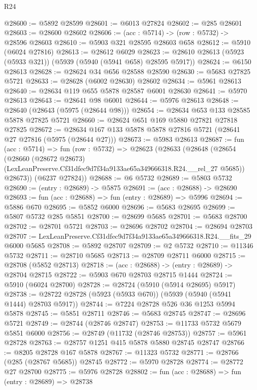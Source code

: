 \begin{lexlean}{R24}
\begin{coremodule}
@28600 := @5892 @28599
@28601 := @6013 @27824
@28602 := @285 @28601
@28603 := @28600 @28602
@28606 := (acc : @5714) -> (row : @5732) -> @28596 @28603
@28610 := @5903 @321 @28595 @28603 @658
@28612 := @5910 (@6024 @27816)
@28613 := @28612 @6029
@28623 := @28610 @28613 (@5923 (@5933 @321)) (@5939 (@5940 (@5941 @658) @28595 @5917))
@28624 := @6150 @28613
@28628 := @28624 @34 @656 @28588 @28590
@28630 := @5683 @27825 @5721
@28633 := @28628 (@6002 @28630) @28602
@28634 := @5961 @28613
@28640 := @28634 @119 @655 @5878 @28587 @6001 @28630
@28641 := @5970 @28613
@28643 := @28641 @98 @6001
@28644 := @5976 @28613
@28648 := @28640 (@28643 (@5975 (@28644 @98)))
@28654 := @28634 @653 @133 @28585 @5878 @27825 @5721
@28660 := @28624 @651 @169 @5880 @27821 @27818 @27825
@28672 := @28634 @167 @133 @5878 @5878 @27816 @5721 (@28641 @27 @27816 (@5975 (@28644 @27)))
@28673 := @5983 @28613
@28687 := fun (acc : @5714) =>
  fun (row : @5732) =>
  @28623
    (@28633
      (@28648
        (@28654
          (@28660
            (@28672 @28673)
            (LexLeanPreserve.Cf31dfec9d7f34a9133ae65a349666318.R24.__rel_27 @5685))
          @28673))
      (@6237 @27824))
@28688 := @6 @5732
@28689 := @5803 @5732
@28690 := (entry : @28689) -> @5875
@28691 := (acc : @28688) -> @28690
@28693 := fun (acc : @28688) => fun (entry : @28689) => @5996
@28694 := @5886 @670
@28695 := @5852 @6000
@28696 := @5683 @28695
@28699 := @5807 @5732 @285 @5851
@28700 := @28699 @5685
@28701 := @5683 @28700
@28702 := @28701 @5721
@28703 := @28696 @28702
@28704 := @28694 @28703
@28707 := LexLeanPreserve.Cf31dfec9d7f34a9133ae65a349666318.R24.__fits_29 @6000 @5685
@28708 := @5892 @28707
@28709 := @2 @5732
@28710 := @11346 @5732
@28711 := @28710 @5685
@28713 := @28709 @28711 @6000
@28715 := @28708 (@5852 @28713)
@28718 := (acc : @28688) -> (entry : @28689) -> @28704 @28715
@28722 := @5903 @670 @28703 @28715 @1444
@28724 := @5910 (@6024 @28700)
@28728 := @28724 (@5910 (@5914 @28695) @5917)
@28738 := @28722 @28728 (@5923 (@5933 @670)) (@5939 (@5940 (@5941 @1444) @28703 @5917))
@28744 := @7224 @28728 @526 @36 @1253 @5994 @5878
@28745 := @5851 @28711
@28746 := @5683 @28745
@28747 := @28696 @5721
@28749 := @28744 (@28746 @28747)
@28753 := @11733 @5732 @5679 @5851 @6000
@28756 := @28749 (@11732 (@28746 @28753))
@28757 := @5961 @28728
@28763 := @28757 @1251 @415 @5878 @5880 @28745 @28747
@28766 := @8205 @28728 @167 @5878
@28767 := @11323 @5732
@28771 := @28766 (@285 (@28767 @5685)) @28745
@28772 := @5970 @28728
@28774 := @28772 @27 @28700
@28775 := @5976 @28728
@28802 := fun (acc : @28688) =>
  fun (entry : @28689) =>
  @28738

\end{coremodule}
\end{lexlean}
